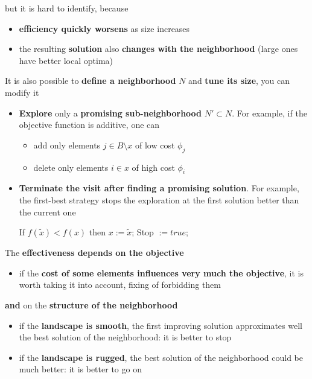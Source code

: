 but it is hard to identify, because
\begin{itemize}
	\item \textbf{efficiency quickly worsens} as size increases
	\item the resulting \textbf{solution} also \textbf{changes with the neighborhood} (large ones have better local optima)
\end{itemize}

\newpage

It is also possible to \textbf{define a neighborhood} $N$ and \textbf{tune its size}, you can modify it
\begin{itemize}
	\item \textbf{Explore} only a \textbf{promising sub-neighborhood} $N′ ⊂ N$. For example, if the objective function is additive, one can
	\begin{itemize}
		\item add only elements $j \in B \setminus x$ of low cost $\phi_j$
		\item delete only elements $i \in x$ of high cost $\phi_i$
	\end{itemize}
	\nn
	
	\item \textbf{Terminate the visit after finding a promising solution}. For example, the first-best strategy stops the exploration at the first solution better than the current one
	\begin{center}
		If $f (\tilde{x}) < f (x)$ then $x := \tilde{x}$; Stop $:= true$;
	\end{center}
	\nn
\end{itemize}

The \textbf{effectiveness depends on the objective}
\begin{itemize}
	\item if the \textbf{cost of some elements influences very much the objective}, it is worth taking it into account, fixing of forbidding them
\end{itemize}

\textbf{and} on the \textbf{structure of the neighborhood}
\begin{itemize}
	\item if the \textbf{landscape is smooth}, the first improving solution approximates well the best solution of the neighborhood: it is better to stop
	
	\item if the \textbf{landscape is rugged}, the best solution of the neighborhood could be much better: it is better to go on
\end{itemize}

